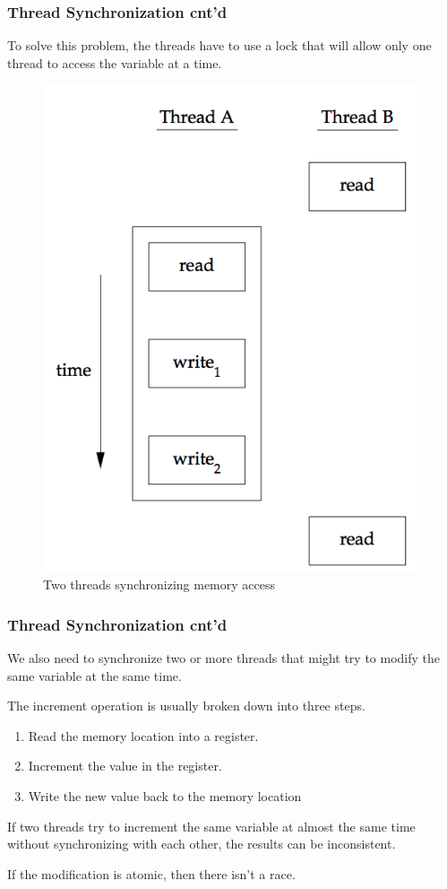 \documentclass[newPxFont,sthlmFooter,nooffset]{beamer}
\begin{document}
\begin{frame}[t]
  \frametitle{Thread Synchronization cnt'd}
To solve this problem, the threads have to use a lock that will allow only one thread to access the variable at a time.

  \begin{figure}[h]
    \centering
    \includegraphics[width=0.4\linewidth]{figure/fig11-8}
    \caption{Two threads synchronizing memory access}
    \label{fig:work}
  \end{figure}


\end{frame}




\begin{frame}[t]
  \frametitle{Thread Synchronization cnt'd}
We also need to synchronize two or more threads that might try to modify the same variable at the same time.

The increment operation is usually broken down into three steps.
\begin{enumerate}
\item  Read the memory location into a register.
\item  Increment the value in the register.
\item  Write the new value back to the memory location
\end{enumerate}

If two threads try to increment the same variable at almost the same time without synchronizing with each other, the results can be inconsistent.

If the modification is atomic, then there isn’t a race.

\end{frame}
\end{document}
